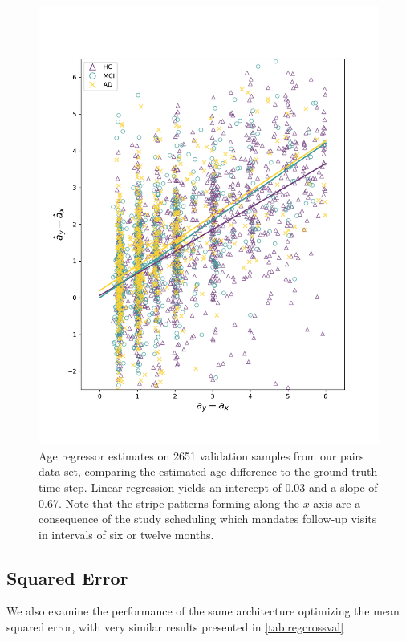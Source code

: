 \begin{figure}
	\centering
	\includegraphics[width=.7\linewidth]{images/age_plots/d_dhat_real}
	\vspace*{-15pt}
	\caption{Age regressor estimates on 2651 validation samples from our pairs data set, comparing the estimated age difference to the ground truth time step. Linear regression yields an intercept of 0.03 and a slope of 0.67. Note that the stripe patterns forming along the $x$-axis are a consequence of the study scheduling which mandates follow-up visits in intervals of six or twelve months.}
	\label{fig:regddhatreal}
\end{figure}

\subsection*{Squared Error}
We also examine the performance of the same architecture optimizing the mean squared error, with very similar results presented in \autoref{tab:regcrossval}

